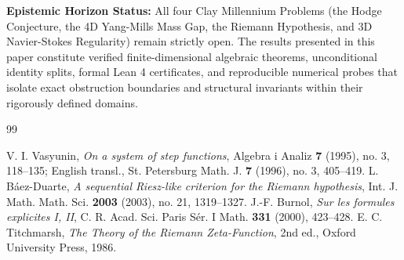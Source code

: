 \documentclass[11pt,a4paper]{article}
\theoremstyle{definition}
\begin{document}
\vspace{0.5em}
\noindent\textbf{Epistemic Horizon Status:} All four Clay Millennium Problems (the Hodge Conjecture, the 4D Yang-Mills Mass Gap, the Riemann Hypothesis, and 3D Navier-Stokes Regularity) remain strictly open. The results presented in this paper constitute verified finite-dimensional algebraic theorems, unconditional identity splits, formal Lean 4 certificates, and reproducible numerical probes that isolate exact obstruction boundaries and structural invariants within their rigorously defined domains.

\begin{thebibliography}{99}

 V. I. Vasyunin, \emph{On a system of step functions}, Algebra i Analiz \textbf{7} (1995), no. 3, 118--135; English transl., St. Petersburg Math. J. \textbf{7} (1996), no. 3, 405--419.
 L. B\'aez-Duarte, \emph{A sequential Riesz-like criterion for the Riemann hypothesis}, Int. J. Math. Math. Sci. \textbf{2003} (2003), no. 21, 1319--1327.
 J.-F. Burnol, \emph{Sur les formules explicites I, II}, C. R. Acad. Sci. Paris S\'er. I Math. \textbf{331} (2000), 423--428.
 E. C. Titchmarsh, \emph{The Theory of the Riemann Zeta-Function}, 2nd ed., Oxford University Press, 1986.

\end{thebibliography}
\end{document}
